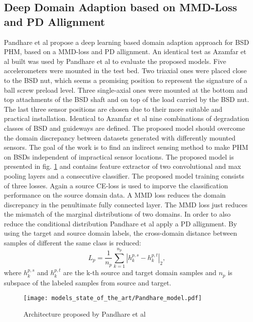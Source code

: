 \subsection{Deep Domain Adaption based on MMD-Loss and PD Allignment}
Pandhare et al \cite{Pandhare2021} propose a deep learning based domain adaption approach for BSD PHM, based on a MMD-loss and PD allignment. An identical test as Azamfar et al \cite{AZAMFAR2020103932} built was used by Pandhare et al to evaluate the proposed models. Five accelerometers were mounted in the test bed. Two triaxial ones were placed close to the BSD nut, which seems a promising position to represent the signature of a ball screw preload level. Three single-axial ones were mounted at  the bottom and top attachments of the BSD shaft and on top of the load carried by the BSD nut. The last three sensor positions are chosen due to their more suitable and practical installation. Identical to Azamfar et al \cite{AZAMFAR2020103932} nine combinations of degradation classes of BSD and guideways are defined. The proposed model should overcome the domain discrepancy between datasets generated with differently mounted sensors. The goal of the work is to find an indirect sensing method to make PHM on BSDs independent of impractical sensor locations. The proposed model is presented in fig. \ref{fig:Pandhare_model} and contains feature extractor of two convolutional and max pooling layers and a consecutive classifier. The proposed model training consists of three losses. Again a source CE-loss is used to imporve the classification performance on the source domain data. A MMD loss reduces the domain discrepancy in the penultimate fully connected layer. The MMD loss just reduces the mismatch of the marginal distributions of two domains. In order to also reduce the conditional distribution Pandhare et al apply a PD allignment. By using the target and source domain labels, the cross-domain distance between samples of different the same class is reduced:
\begin{equation}
    L_{p} = \frac{1}{n_{p}}\sum_{k=1}^{n_{p}}|h_{k}^{p,s}-h_{k}^{p,t}|_{2}, 
\end{equation}
where $h_{k}^{p,s}$ and $h_{k}^{p,t}$ are the k-th source and target domain samples and $n_{p}$ is subspace of the labeled samples from source and target. 

\begin{figure}[H]
  \centering
  \texttt{[image: models\_state\_of\_the\_art/Pandhare\_model.pdf]}
  \caption{Architecture proposed by Pandhare et al \cite{Pandhare2021}}
  \label{fig:Pandhare_model}
\end{figure}


